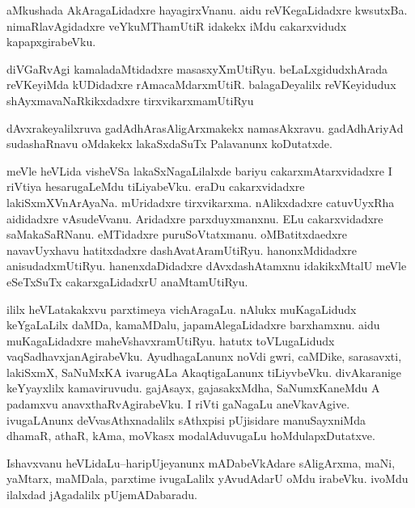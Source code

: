 \documentclass{article}
\begin{document}
\begin{mn}%
aMkushada AkAragaLidadxre hayagirxVnanu. aidu reVKegaLidadxre kwsutxBa. nimaRlavAgidadxre 
veYkuMThamUtiR idakekx iMdu cakarxvidudx kapapxgirabeVku.
\end{mn}

\begin{mn}%
diVGaRvAgi kamaladaMtidadxre masasxyXmUtiRyu. beLaLxgidudxhArada reVKeyiMda kUDidadxre 
rAmacaMdarxmUtiR. balagaDeyalilx reVKeyidudux shAyxmavaNaRkikxdadxre tirxvikarxmamUtiRyu
\end{mn}

\begin{mn}%
dAvxrakeyalilxruva gadAdhArasAligArxmakekx namasAkxravu. gadAdhAriyAd sudashaRnavu 
oMdakekx lakaSxdaSuTx Palavanunx koDutatxde.
\end{mn}

\begin{mn}%
meVle heVLida visheVSa lakaSxNagaLilalxde bariyu cakarxmAtarxvidadxre I riVtiya 
hesarugaLeMdu tiLiyabeVku. eraDu cakarxvidadxre lakiSxmXVnArAyaNa. mUridadxre 
tirxvikarxma. nAlikxdadxre catuvUyxRha aididadxre vAsudeVvanu. Aridadxre parxduyxmanxnu. 
ELu cakarxvidadxre saMakaSaRNanu. eMTidadxre  puruSoVtatxmanu. oMBatitxdaedxre 
navavUyxhavu hatitxdadxre dashAvatAramUtiRyu. hanonxMdidadxre anisudadxmUtiRyu. 
hanenxdaDidadxre dAvxdashAtamxnu idakikxMtalU meVle eSeTxSuTx cakarxgaLidadxrU anaMtamUtiRyu.
\end{mn}

\begin{mn}%
ililx heVLatakakxvu parxtimeya vichAragaLu. nAlukx muKagaLidudx keYgaLaLilx daMDa, 
kamaMDalu, japamAlegaLidadxre barxhamxnu. aidu muKagaLidadxre maheVshavxramUtiRyu. hatutx 
toVLugaLidudx vaqSadhavxjanAgirabeVku. AyudhagaLanunx noVdi gwri, caMDike, sarasavxti, 
lakiSxmX, SaNuMxKA ivarugALa AkaqtigaLanunx tiLiyvbeVku. divAkaranige keYyayxlilx 
kamaviruvudu. gajAsayx, gajasakxMdha, SaNumxKaneMdu A padamxvu anavxthaRvAgirabeVku.
I riVti gaNagaLu aneVkavAgive. ivugaLAnunx deVvasAthxnadalilx sAthxpisi pUjisidare 
manuSayxniMda dhamaR, athaR, kAma, moVkasx modalAduvugaLu hoMdulapxDutatxve.
\end{mn}


\begin{mn}%
Ishavxvanu heVLidaLu--haripUjeyanunx mADabeVkAdare sAligArxma, maNi, yaMtarx, maMDala, 
parxtime ivugaLalilx yAvudAdarU oMdu irabeVku. ivoMdu ilalxdad jAgadalilx pUjemADabaradu.
\end{mn}
\end{document}
